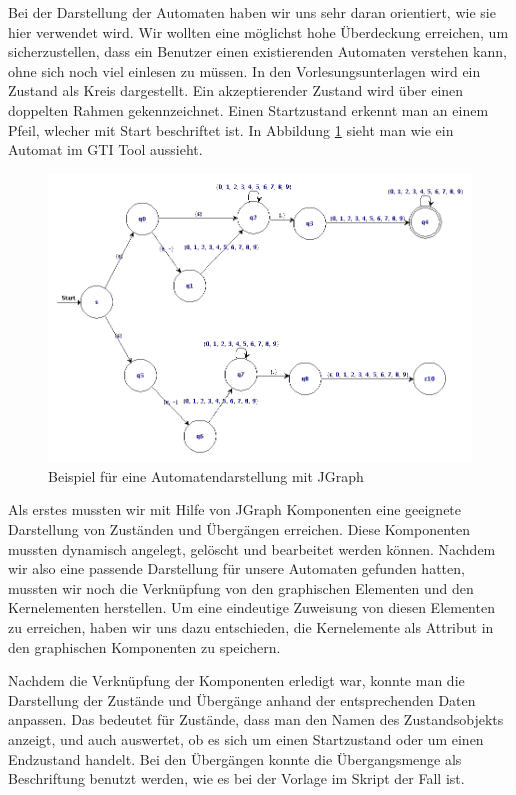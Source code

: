 Bei der Darstellung der Automaten haben wir uns sehr daran orientiert, wie sie
hier \cite{Sieber} verwendet wird. Wir wollten eine möglichst hohe Überdeckung
erreichen, um sicherzustellen, dass ein Benutzer einen existierenden Automaten
verstehen kann, ohne sich noch viel einlesen zu müssen. In den
Vorlesungsunterlagen wird ein Zustand als Kreis dargestellt. Ein akzeptierender
Zustand wird über einen doppelten Rahmen gekennzeichnet. Einen Startzustand
erkennt man an einem Pfeil, wlecher mit Start beschriftet ist. In
Abbildung \ref{FigureMachine} sieht man wie ein Automat im GTI Tool
aussieht.\vspace{10pt}

\begin{figure}[h!]
\begin{center}
\includegraphics[width=12cm]{../images/enfa_example.png}
\caption{Beispiel für eine Automatendarstellung mit JGraph}
\label{FigureMachine}
\end{center}
\end{figure}
\vspace{10pt}

Als erstes mussten wir mit Hilfe von JGraph Komponenten eine geeignete
Darstellung von Zuständen und Übergängen erreichen. Diese Komponenten mussten dynamisch
angelegt, gelöscht und bearbeitet werden können. Nachdem wir also eine passende
Darstellung für unsere Automaten gefunden hatten, mussten wir noch die
Verknüpfung von den graphischen Elementen und den Kernelementen herstellen. Um
eine eindeutige Zuweisung von diesen Elementen zu erreichen, haben wir uns dazu
entschieden, die Kernelemente als Attribut in den graphischen Komponenten zu
speichern.\vspace{10pt}

Nachdem die Verknüpfung der Komponenten erledigt war, konnte man die Darstellung
der Zustände und Übergänge anhand der entsprechenden Daten anpassen. Das bedeutet
für Zustände, dass man den Namen des Zustandsobjekts anzeigt, und auch auswertet,
ob es sich um einen Startzustand oder um einen Endzustand handelt. Bei den
Übergängen konnte die Übergangsmenge als Beschriftung benutzt werden, wie es bei
der Vorlage im Skript der Fall ist.\vspace{10pt}


